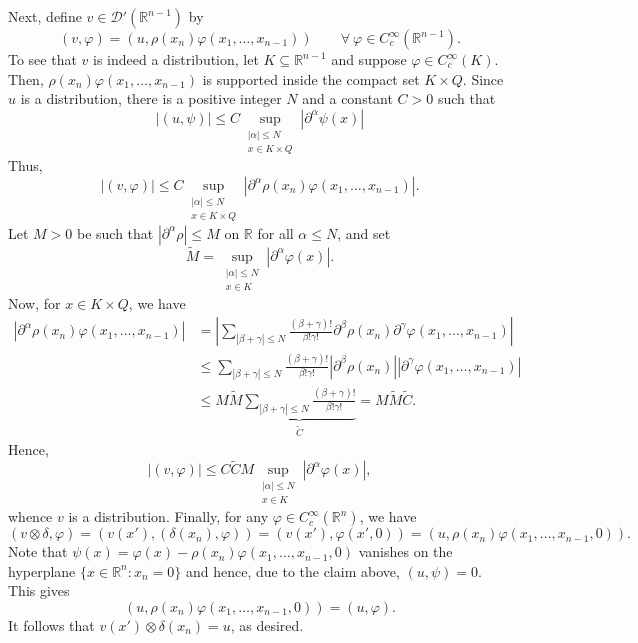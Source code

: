 \documentclass[10pt]{amsart}
\theoremstyle{thmstyle}
\theoremstyle{defstyle}
\newcommand{\R}{\mathbb{R}}
\newcommand{\wt}[1]{\widetilde{#1}}
\renewcommand{\le}{\leqslant}
\begin{document}
Next, define $v\in\mathscr D'(\R^{n - 1})$ by 
\begin{equation*}
    (v, \varphi) = \left(u, \rho(x_n)\varphi(x_1,\dots,x_{n - 1})\right)\qquad\forall~\varphi\in C_c^\infty(\R^{n - 1}).
\end{equation*}
To see that $v$ is indeed a distribution, let $K\subseteq\R^{n - 1}$ and suppose $\varphi\in C_c^\infty(K)$. Then, $\rho(x_n)\varphi(x_1,\dots,x_{n - 1})$ is supported inside the compact set $K\times Q$. Since $u$ is a distribution, there is a positive integer $N$ and a constant $C > 0$ such that 
\begin{equation*}
    |(u, \psi)|\le C\sup_{\substack{|\alpha|\le N\\ x\in K\times Q}} |\partial^\alpha\psi(x)|
\end{equation*}
Thus, 
\begin{equation*}
    |(v,\varphi)|\le C\sup_{\substack{|\alpha|\le N\\ x\in K\times Q}}|\partial^\alpha \rho(x_n)\varphi(x_1,\dots,x_{n - 1})|.
\end{equation*}
Let $M > 0$ be such that $|\partial^\alpha \rho|\le M$ on $\R$ for all $\alpha\le N$, and set 
\begin{equation*}
    \wt M = \sup_{\substack{|\alpha|\le N\\ x\in K}}|\partial^\alpha\varphi(x)|.
\end{equation*}
Now, for $x\in K\times Q$, we have 
\begin{align*}
    \left|\partial^\alpha\rho(x_n)\varphi(x_1,\dots,x_{n - 1})\right| &= \left|\sum_{|\beta + \gamma|\le N}\frac{(\beta + \gamma)!}{\beta!\gamma!}\partial^\beta\rho(x_n)\partial^\gamma\varphi(x_1,\dots,x_{n - 1})\right|\\
    &\le\sum_{|\beta + \gamma|\le N}\frac{(\beta + \gamma)!}{\beta!\gamma!}\left|\partial^\beta\rho(x_n)\right|\left|\partial^\gamma\varphi(x_1,\dots,x_{n - 1})\right|\\
    &\le M\wt M\underbrace{\sum_{|\beta + \gamma|\le N}\frac{(\beta + \gamma)!}{\beta!\gamma!}}_{\wt C} = M\wt M\wt C.
\end{align*}
Hence, 
\begin{equation*}
    |(v, \varphi)|\le C\wt C M\sup_{\substack{|\alpha|\le N\\ x\in K}}|\partial^\alpha\varphi(x)|,
\end{equation*}
whence $v$ is a distribution. Finally, for any $\varphi\in C_c^\infty(\R^n)$, we have 
\begin{equation*}
    (v\otimes\delta, \varphi) = \left(v(x'), \left(\delta(x_n),\varphi\right)\right) = (v(x'), \varphi(x', 0)) = (u, \rho(x_n)\varphi(x_1,\dots,x_{n - 1}, 0)).
\end{equation*}
Note that $\psi(x) = \varphi(x) - \rho(x_n)\varphi(x_1,\dots,x_{n - 1}, 0)$ vanishes on the hyperplane $\{x\in\R^n\colon x_n = 0\}$ and hence, due to the claim above, $(u, \psi) = 0$. This gives
\begin{equation*}
    (u, \rho(x_n)\varphi(x_1,\dots,x_{n - 1}, 0)) = (u, \varphi).
\end{equation*}
It follows that $v(x')\otimes\delta(x_n) = u$, as desired.
\end{document}
